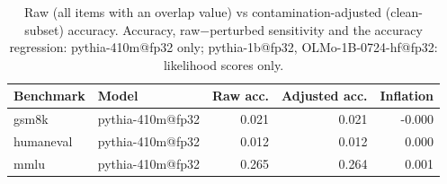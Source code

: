 \begin{table}[t]
\centering
\caption{Raw (all items with an overlap value) vs contamination-adjusted (clean-subset) accuracy. Accuracy, raw$-$perturbed sensitivity and the accuracy regression: pythia-410m@fp32 only; pythia-1b@fp32, OLMo-1B-0724-hf@fp32: likelihood scores only. }
\label{tab:adjusted}
\begin{tabular}{llrrr}
\toprule
Benchmark & Model & Raw acc. & Adjusted acc. & Inflation \\
\midrule
gsm8k & pythia-410m@fp32 & 0.021 & 0.021 & -0.000 \\
\midrule
humaneval & pythia-410m@fp32 & 0.012 & 0.012 & 0.000 \\
\midrule
mmlu & pythia-410m@fp32 & 0.265 & 0.264 & 0.001 \\
\bottomrule
\end{tabular}
\end{table}
